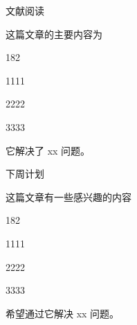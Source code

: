 \begin{frame}{文献阅读}
     

    \vfill
    这篇文章的主要内容为
    \begin{dingautolist}{182}
        \item 1111
        \item 2222
        \item 3333
    \end{dingautolist}
    它解决了 xx 问题。
\end{frame}

\begin{frame}{下周计划}
     
    
    \vfill
    这篇文章有一些感兴趣的内容
    \begin{dingautolist}{182}
        \item 1111
        \item 2222
        \item 3333
    \end{dingautolist}
    希望通过它解决 xx 问题。
\end{frame}